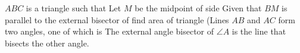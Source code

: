 $ABC$ is a triangle such that   Let $M$ be the midpoint of side  Given that $BM$ is parallel to the external bisector of  find area of triangle  (Lines $AB$ and $AC$ form two angles, one of which is  The external angle bisector of $\angle A$ is the line that bisects the other angle.